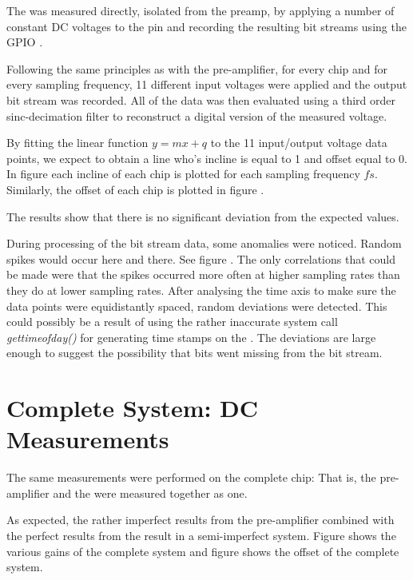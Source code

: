 The \sdm was measured directly, isolated from the preamp, by applying a number
of  constant  DC  voltages  to  the  pin  and  recording  the
resulting bit streams using the GPIO \raspi.

Following  the  same  principles as with the pre-amplifier, for every chip and
for every sampling frequency, 11 different input voltages were applied and the
output bit  stream  was  recorded.  All of the data was then evaluated using a
third order sinc-decimation filter to reconstruct a  digital  version  of  the
measured voltage.

By  fitting the linear function $y=mx+q$ to the 11 input/output  voltage  data
points, we expect  to  obtain  a  line  who's incline is equal to 1 and offset
equal  to  0.  In  figure   each incline of each  chip  is
plotted for each sampling frequency $fs$.  Similarly,  the offset of each chip
is plotted in figure .

The  results  show that there is no significant deviation  from  the  expected
values.

During processing of the bit stream data, some anomalies were noticed.  Random
spikes would  occur  here and there. See figure . The only correlations that could  be  made  were that the
spikes  occurred  more  often  at  higher sampling rates than they do at lower
sampling rates. After analysing the time axis  to  make  sure  the data points
were  equidistantly  spaced,  random  deviations  were  detected.  This  could
possibly   be   a  result  of  using  the  rather   inaccurate   system   call
\textit{gettimeofday()}  for  generating  time  stamps  on  the   \raspi.  The
deviations are large enough to  suggest the possibility that bits went missing
from the bit stream.

\section{Complete System: DC Measurements}
\label{sec:systemDC}

The  same  measurements  were  performed  on  the complete chip: That is,  the
pre-amplifier and the \sdm were measured together as one.

As expected, the rather imperfect results from the pre-amplifier combined with
the  perfect  results  from the \sdm result in a semi-imperfect system. Figure
 shows the various gains  of
the complete system and  figure  
shows the offset of the complete system.

